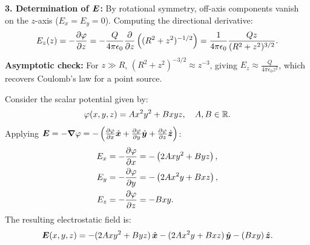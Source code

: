 \begin{example}
\textbf{3. Determination of $\vb*{E}$:}
By rotational symmetry, off-axis components vanish on the $z$-axis ($E_x = E_y = 0$). Computing the directional derivative:
\begin{equation}
    E_z(z) = -\pdv{\varphi}{z} = -\frac{Q}{4\pi\epsilon_0} \pdv{z}\left( (R^2+z^2)^{-1/2} \right) = \frac{1}{4\pi\epsilon_0} \frac{Q z}{(R^2+z^2)^{3/2}}.
\end{equation}
\textbf{Asymptotic check:} For $z \gg R$, $(R^2+z^2)^{-3/2} \approx z^{-3}$, giving $E_z \approx \frac{Q}{4\pi\epsilon_0 z^2}$, which recovers Coulomb's law for a point source.
\end{example}

\begin{example}
Consider the scalar potential given by:
\begin{equation}
    \varphi(x,y,z) = A x^2 y^2 + B x y z, \quad A, B \in \mathbb{R}.
\end{equation}
Applying $\vb*{E} = -\grad{\varphi} = -\left( \pdv{\varphi}{x}\hat{\vb*{x}} + \pdv{\varphi}{y}\hat{\vb*{y}} + \pdv{\varphi}{z}\hat{\vb*{z}} \right)$:
\begin{align}
    E_x &= -\pdv{\varphi}{x} = -\left( 2A x y^2 + B y z \right), \\
    E_y &= -\pdv{\varphi}{y} = -\left( 2A x^2 y + B x z \right), \\
    E_z &= -\pdv{\varphi}{z} = -B x y.
\end{align}
The resulting electrostatic field is:
\begin{equation}
    \vb*{E}(x,y,z) = -(2A x y^2 + B y z)\,\hat{\vb*{x}} - (2A x^2 y + B x z)\,\hat{\vb*{y}} - (B x y)\,\hat{\vb*{z}}.
\end{equation}
\end{example}